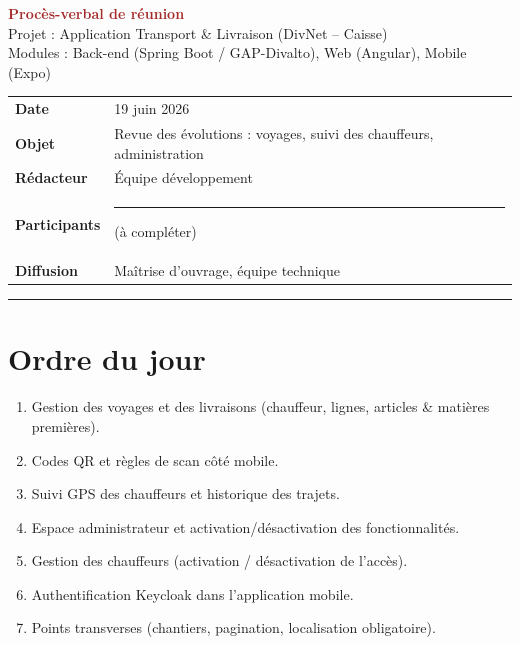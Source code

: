 \documentclass[11pt,a4paper]{article}
\begin{document}
\begin{center}
  {\LARGE \textbf{\textcolor{brown}{Procès-verbal de réunion}}}\\[4pt]
  {\large Projet : Application Transport \& Livraison (DivNet -- Caisse)}\\[2pt]
  {\normalsize Modules : Back-end (Spring Boot / GAP-Divalto), Web (Angular), Mobile (Expo)}
\end{center}

\vspace{0.6em}

\noindent
\begin{tabular}{@{}>{\bfseries}p{3.5cm} p{12.5cm}@{}}
  Date & 19 juin 2026 \\
  Objet & Revue des évolutions : voyages, suivi des chauffeurs, administration \\
  Rédacteur & Équipe développement \\
  Participants & \rule{6cm}{0.4pt} \quad (à compléter) \\
  Diffusion & Maîtrise d'ouvrage, équipe technique \\
\end{tabular}

\vspace{0.8em}
\hrule
\vspace{0.8em}

\section{Ordre du jour}
\begin{enumerate}[leftmargin=*, itemsep=1pt]
  \item Gestion des voyages et des livraisons (chauffeur, lignes, articles \& matières premières).
  \item Codes QR et règles de scan côté mobile.
  \item Suivi GPS des chauffeurs et historique des trajets.
  \item Espace administrateur et activation/désactivation des fonctionnalités.
  \item Gestion des chauffeurs (activation / désactivation de l'accès).
  \item Authentification Keycloak dans l'application mobile.
  \item Points transverses (chantiers, pagination, localisation obligatoire).
\end{enumerate}
\end{document}
